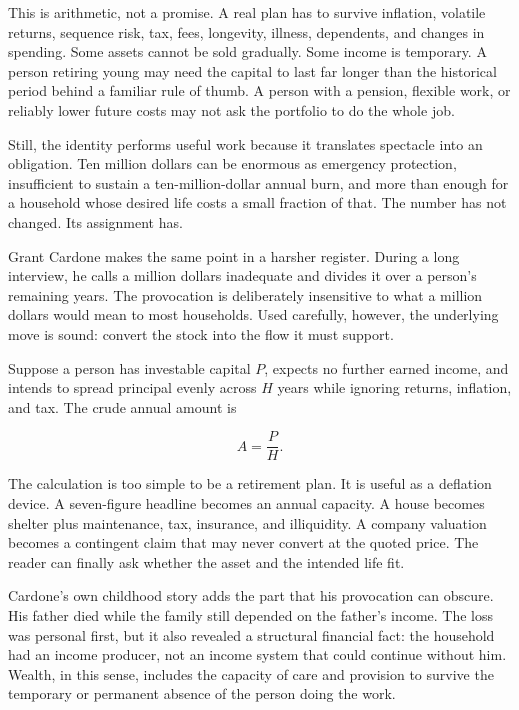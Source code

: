 This is arithmetic, not a promise. A real plan has to survive inflation,
volatile returns, sequence risk, tax, fees, longevity, illness, dependents, and
changes in spending. Some assets cannot be sold gradually. Some income is
temporary. A person retiring young may need the capital to last far longer
than the historical period behind a familiar rule of thumb. A person with a
pension, flexible work, or reliably lower future costs may not ask the portfolio
to do the whole job.

Still, the identity performs useful work because it translates spectacle into
an obligation. Ten million dollars can be enormous as emergency protection,
insufficient to sustain a ten-million-dollar annual burn, and more than enough
for a household whose desired life costs a small fraction of that. The number
has not changed. Its assignment has.

Grant Cardone makes the same point in a harsher register. During a long
interview, he calls a million dollars inadequate and divides it over a person's
remaining years. The provocation is deliberately insensitive to what a million
dollars would mean to most households. Used carefully, however, the underlying
move is sound: convert the stock into the flow it must support.

Suppose a person has investable capital $P$, expects no further earned income,
and intends to spread principal evenly across $H$ years while ignoring returns,
inflation, and tax. The crude annual amount is

\begin{equation}
A = \frac{P}{H}.
\end{equation}

The calculation is too simple to be a retirement plan. It is useful as a
deflation device. A seven-figure headline becomes an annual capacity. A house
becomes shelter plus maintenance, tax, insurance, and illiquidity. A company
valuation becomes a contingent claim that may never convert at the quoted
price. The reader can finally ask whether the asset and the intended life fit.

Cardone's own childhood story adds the part that his provocation can obscure.
His father died while the family still depended on the father's income. The
loss was personal first, but it also revealed a structural financial fact: the
household had an income producer, not an income system that could continue
without him. Wealth, in this sense, includes the capacity of care and provision
to survive the temporary or permanent absence of the person doing the work.

